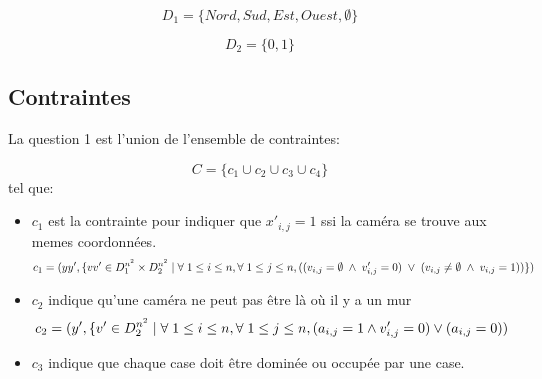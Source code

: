 \documentclass[a4paper,11pt]{article}
\begin{document}
$$D_1 = \{Nord, Sud, Est, Ouest, \emptyset\}$$

$$D_2 = \{0,1\}$$

\subsection{Contraintes}
La question 1 est l'union de l’ensemble de contraintes:

$$C = \{c_{1} \cup c_{2} \cup c_{3} \cup c_{4}\} $$
tel que:
\begin{itemize}
\item $c_{1}$ est la contrainte pour indiquer que $x'_{i,j} = 1$ ssi la caméra se trouve aux memes coordonnées.
  $$c_{1} = ( yy', \{ vv' \in  D_1^{n^2} \times D_2^{n^2} \mid \forall \hspace{0.1cm} 1\leq i \leq n, \forall \hspace{0.1cm} 1\leq j \leq n,
  ((v_{i,j} = \emptyset \hspace{0.1cm} \wedge \hspace{0.1cm} v'_{i,j} = 0)
   \hspace{0.1cm} \vee \hspace{0.1cm}
  (v_{i,j}  \neq \emptyset \hspace{0.1cm}\wedge \hspace{0.1cm} v_{i,j} = 1)) \} ) $$
   
\item $c_{2}$ indique qu'une caméra ne peut pas être là où il y a un mur 
  $$c_{2} = ( y', \{ v' \in D_2^{n^2} \mid \forall \hspace{0.1cm} 1\leq i \leq n, \forall \hspace{0.1cm} 1\leq j \leq n, (a_{i,j} = 1 \wedge v'_{i,j} = 0 ) \vee (a_{i,j} = 0))$$  

\item $c_{3}$ indique que chaque case doit être dominée ou occupée par une case.


\end{itemize}
\end{document}
